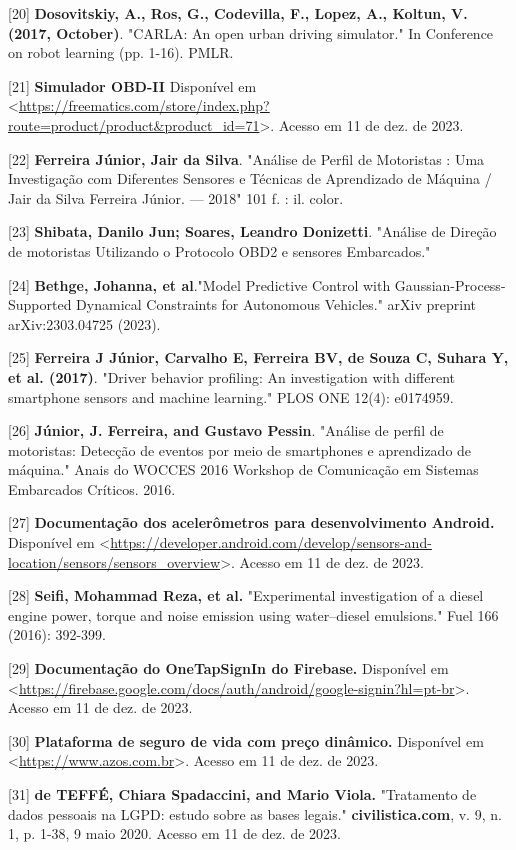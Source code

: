 [20] \textbf{Dosovitskiy, A., Ros, G., Codevilla, F., Lopez, A., Koltun, V. (2017, October)}. "CARLA: An open urban driving simulator." In Conference on robot learning (pp. 1-16). PMLR.

[21] \textbf{Simulador OBD-II} Disponível em <\url{https://freematics.com/store/index.php?route=product/product&product_id=71}>. Acesso em 11 de dez. de 2023.


[22] \textbf{Ferreira Júnior, Jair da Silva}.
"Análise de Perfil de Motoristas : Uma Investigação com Diferentes Sensores e Técnicas de
Aprendizado de Máquina / Jair da Silva Ferreira Júnior. — 2018"
101 f. : il. color.

[23] \textbf{Shibata, Danilo Jun; Soares, Leandro Donizetti}. "Análise de Direção de motoristas Utilizando o Protocolo OBD2 e sensores Embarcados."

[24] \textbf{Bethge, Johanna, et al}."Model Predictive Control with Gaussian-Process-Supported Dynamical Constraints for Autonomous Vehicles." arXiv preprint arXiv:2303.04725 (2023).

[25] \textbf{Ferreira J Júnior, Carvalho E, Ferreira BV, de Souza C, Suhara Y, et al. (2017)}. "Driver behavior profiling: An investigation with different smartphone sensors and machine learning." PLOS ONE 12(4): e0174959.

[26] \textbf{Júnior, J. Ferreira, and Gustavo Pessin}. "Análise de perfil de motoristas: Detecção de eventos por meio de smartphones e aprendizado de máquina." Anais do WOCCES 2016 Workshop de Comunicação em Sistemas Embarcados Críticos. 2016.

[27] \textbf{Documentação dos acelerômetros para desenvolvimento Android.} Disponível em <\url{https://developer.android.com/develop/sensors-and-location/sensors/sensors_overview}>. Acesso em 11 de dez. de 2023.

[28] \textbf{Seifi, Mohammad Reza, et al.} "Experimental investigation of a diesel engine power, torque and noise emission using water–diesel emulsions." Fuel 166 (2016): 392-399.

[29] \textbf{Documentação do OneTapSignIn do Firebase.} Disponível em <\url{https://firebase.google.com/docs/auth/android/google-signin?hl=pt-br}>. Acesso em 11 de dez. de 2023.

[30] \textbf{Plataforma de seguro de vida com preço dinâmico.} Disponível em <\url{https://www.azos.com.br}>. Acesso em 11 de dez. de 2023.

[31] \textbf{de TEFFÉ, Chiara Spadaccini, and Mario Viola. } "Tratamento de dados pessoais na LGPD: estudo sobre as bases legais." \textbf{civilistica.com}, v. 9, n. 1, p. 1-38, 9 maio 2020. Acesso em 11 de dez. de 2023.

